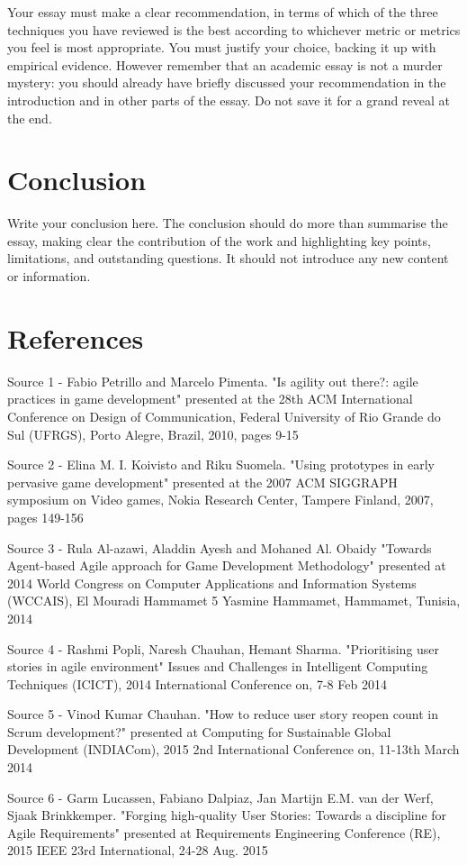 \documentclass{scrartcl}
\begin{document}
Your essay must make a clear recommendation, in terms of which of the three techniques you have reviewed is the best according to whichever metric or metrics you feel is most appropriate. You must justify your choice, backing it up with empirical evidence. However remember that an academic essay is not a murder mystery: you should already have briefly discussed your recommendation in the introduction and in other parts of the essay. Do not save it for a grand reveal at the end.

\section{Conclusion}

Write your conclusion here. The conclusion should do more than summarise the essay, making clear the contribution of the work and highlighting key points, limitations, and outstanding questions. It should not introduce any new content or information.

\section{References}

Source 1 - Fabio Petrillo and Marcelo Pimenta. "Is agility out there?: agile practices in game development" presented at the 28th ACM International Conference on Design of Communication, Federal University of Rio Grande do Sul (UFRGS), Porto Alegre, Brazil, 2010, pages 9-15\par

Source 2 - Elina M. I. Koivisto and Riku Suomela. "Using prototypes in early pervasive game development" presented at the 2007 ACM SIGGRAPH symposium on Video games, Nokia Research Center, Tampere Finland, 2007, pages 149-156\par

Source 3 - Rula Al-azawi, Aladdin Ayesh and Mohaned Al. Obaidy "Towards Agent-based Agile approach for Game Development Methodology" presented at 2014 World Congress on Computer Applications and Information Systems (WCCAIS), El Mouradi Hammamet 5 Yasmine Hammamet, Hammamet, Tunisia, 2014\par

Source 4 - Rashmi Popli, Naresh Chauhan, Hemant Sharma. "Prioritising user stories in agile environment" Issues and Challenges in Intelligent Computing Techniques (ICICT), 2014 International Conference on, 7-8 Feb 2014\par

Source 5 - Vinod Kumar Chauhan. "How to reduce user story reopen count in Scrum development?" presented at Computing for Sustainable Global Development (INDIACom), 2015 2nd International Conference on, 11-13th March 2014\par

Source 6 - Garm Lucassen, Fabiano Dalpiaz, Jan Martijn E.M. van der Werf, Sjaak Brinkkemper. "Forging high-quality User Stories: Towards a discipline for Agile Requirements" presented at Requirements Engineering Conference (RE), 2015 IEEE 23rd International, 24-28 Aug. 2015\par



\end{document}
